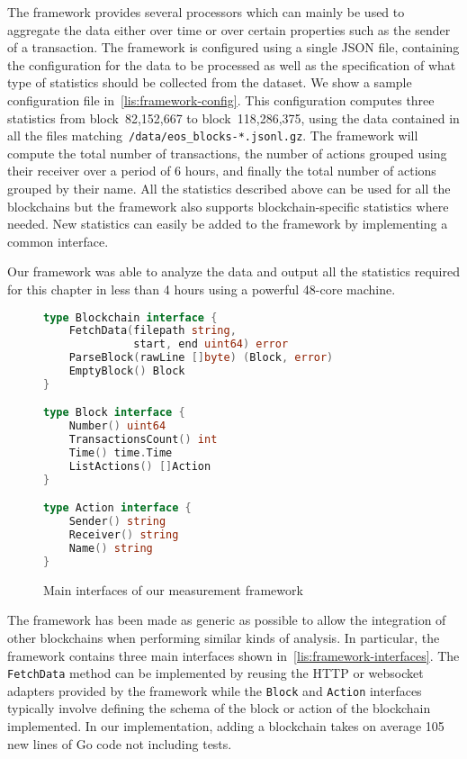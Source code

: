 The framework provides several processors which can mainly be used to aggregate the data either over time or over certain properties such as the sender of a transaction.
The framework is configured using a single JSON file, containing the configuration for the data to be processed as well as the specification of what type of statistics should be collected from the dataset. We show a sample configuration file in~\autoref{lis:framework-config}.
This configuration computes three statistics from block~82,152,667 to block~118,286,375, using the data contained in all the files matching~\lstinline{/data/eos_blocks-*.jsonl.gz}.
The framework will compute the total number of transactions, the number of actions grouped using their receiver over a period of 6 hours, and finally the total number of actions grouped by their name.
All the statistics described above can be used for all the blockchains but the framework also supports blockchain-specific statistics where needed.
New statistics can easily be added to the framework by implementing a common interface.

Our framework was able to analyze the data and output all the statistics required for this chapter in less than 4 hours using a powerful 48-core machine.

\begin{figure}[ht]
\begin{lstlisting}[language=go]
type Blockchain interface {
    FetchData(filepath string,
              start, end uint64) error
    ParseBlock(rawLine []byte) (Block, error)
    EmptyBlock() Block
}

type Block interface {
    Number() uint64
    TransactionsCount() int
    Time() time.Time
    ListActions() []Action
}

type Action interface {
    Sender() string
    Receiver() string
    Name() string
}
\end{lstlisting}
  \caption{Main interfaces of our measurement framework}
  \label{lis:framework-interfaces}
\end{figure}

The framework has been made as generic as possible to allow the integration of other blockchains when performing similar kinds of analysis.
In particular, the framework contains three main interfaces shown in~\autoref{lis:framework-interfaces}.
The \lstinline{FetchData} method can be implemented by reusing the HTTP or websocket adapters provided by the framework while the \lstinline{Block} and \lstinline{Action} interfaces typically involve defining the schema of the block or action of the blockchain implemented.
In our implementation, adding a blockchain takes on average 105 new lines of Go code not including tests.


